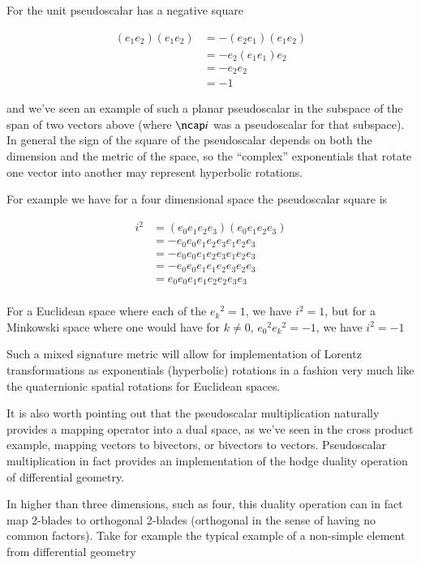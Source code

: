 \documentclass{article}
\begin{document}
For  the unit pseudoscalar has a negative square

\begin{align*}
(e_1 e_2) (e_1 e_2)
&=
- (e_2 e_1) (e_1 e_2) \\
&=
- e_2 (e_1 e_1) e_2 \\
&=
- e_2 e_2 \\
&=
-1
\end{align*}

and we've seen an example of such a planar pseudoscalar in the subspace of the span of two vectors above (where $\ncap i$ was a pseudoscalar
for that subspace).  In general the sign of the square of the pseudoscalar depends on both the dimension and the metric of the space, 
so the ``complex'' exponentials that rotate one vector into another may represent hyperbolic rotations.

For example we have for a four dimensional space the pseudoscalar square is

\begin{align*}
i^2 &=
(e_0 e_1 e_2 e_3) (e_0 e_1 e_2 e_3) \\
&=
- e_0 e_0 e_1 e_2 e_3 e_1 e_2 e_3 \\
&=
- e_0 e_0 e_1 e_2 e_3 e_1 e_2 e_3 \\
&=
- e_0 e_0 e_1 e_1 e_2 e_3 e_2 e_3 \\
&=
e_0 e_0 e_1 e_1 e_2 e_2 e_3 e_3 \\
\end{align*}

For a Euclidean space where each of the ${e_k}^2 = 1$, we have $i^2 = 1$, but for a Minkowski space where one would have for $k\ne0$, ${e_0}^2 {e_k}^2 = -1$, we have $i^2 = -1$

Such a mixed signature metric will allow for implementation of Lorentz transformations as exponentials (hyperbolic) rotations
in a fashion very much like the quaternionic spatial rotations for Euclidean spaces.

It is also worth pointing out that the pseudoscalar multiplication naturally provides a mapping operator into a dual space, as we've seen 
in the cross product example, mapping vectors to bivectors, or bivectors to vectors.  Pseudoscalar multiplication in fact provides an 
implementation of the hodge duality operation of differential geometry.

In higher than three dimensions, such as four, this duality operation can in fact map 2-blades to orthogonal 2-blades (orthogonal in the sense
of having no common factors).  Take for example the typical example of a non-simple element from differential geometry
\end{document}
